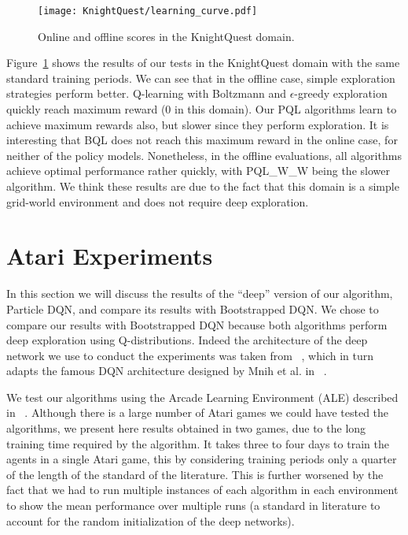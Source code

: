 \begin{figure}
 \texttt{[image: KnightQuest/learning\_curve.pdf]}
 \caption{Online and offline scores in the KnightQuest domain.}
 \label{fig:knightQuest_learning_curve}
\end{figure}
Figure~\ref{fig:knightQuest_learning_curve} shows the results of our tests in the KnightQuest domain with the same standard training periods. We can see that in the offline case, simple exploration strategies perform better. Q-learning with Boltzmann and $\epsilon$-greedy exploration quickly reach maximum reward (0 in this domain). Our PQL algorithms learn to achieve maximum rewards also, but slower since they perform exploration. It is interesting that BQL does not reach this maximum reward in the online case, for neither of the policy models. Nonetheless, in the offline evaluations, all algorithms achieve optimal performance rather quickly, with PQL\_W\_W being the slower algorithm. We think these results are due to the fact that this domain is a simple grid-world environment and does not require deep exploration.
\section{Atari Experiments}		 \label{sec:atari_experiments}
In this section we will discuss the results of the ``deep'' version of our algorithm, Particle DQN, and compare its results with Bootstrapped DQN. We chose to compare our results with Bootstrapped DQN because both algorithms perform deep exploration using Q-distributions. Indeed the architecture of the deep network we use to conduct the experiments was taken from ~\cite{DBLP:journals/corr/OsbandBPR16}, which in turn adapts the famous DQN architecture designed by Mnih et al. in ~\cite{mnih2015humanlevel}.\par
We test our algorithms using the Arcade Learning Environment (ALE) described in ~\cite{Bellemare:2013:ALE:2566972.2566979}. Although there is a large number of Atari games we could have tested the algorithms, we present here results obtained in two games, due to the long training time required by the algorithm. It takes three to four days to train the agents in a single Atari game, this by considering training periods only a quarter of the length of the standard of the literature. This is further worsened by the fact that we had to run multiple instances of each algorithm in each environment to show the mean performance over multiple runs (a standard in literature to account for the random initialization of the deep networks).
